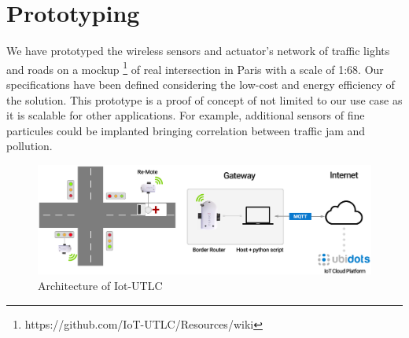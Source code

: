 \documentclass[conference]{../../setup/IEEEtran}
\begin{document}

\section{Prototyping} \label{sec:Prototyping}

We have prototyped the wireless sensors and actuator's network of traffic lights and roads on a mockup \footnote{https://github.com/IoT-UTLC/Resources/wiki} of real intersection in Paris with a scale of 1:68. Our specifications have been defined considering the low-cost and energy efficiency of the solution. This prototype is a proof of concept of not limited to our use case as it is scalable for other applications. For example, additional sensors of fine particules could be implanted bringing correlation between traffic jam and pollution. 
\begin{figure}[!htb]
\centering
\includegraphics[width=4.5in]{res/ScenarioPaper.eps}
\caption{Architecture of  Iot-UTLC}
\label{fig:ScenarioPaper.eps}
\end{figure}

\end{document}
